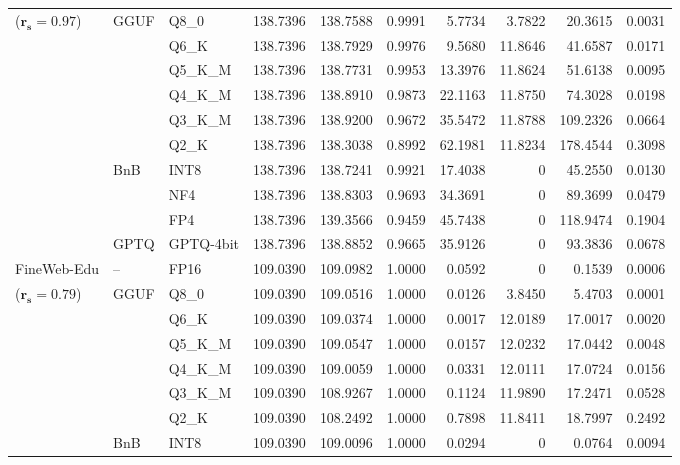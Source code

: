 \begin{table}[t]
{\begin{tabular}{ll l rrrrrrr}
{\small ($\mathbf{r_s{=}0.97}$)} & GGUF & Q8\_0 & 138.7396 & 138.7588 & 0.9991 & 5.7734 & 3.7822 & 20.3615 & 0.0031 \\
 &  & Q6\_K & 138.7396 & 138.7929 & 0.9976 & 9.5680 & 11.8646 & 41.6587 & 0.0171 \\
 &  & Q5\_K\_M & 138.7396 & 138.7731 & 0.9953 & 13.3976 & 11.8624 & 51.6138 & 0.0095 \\
 &  & Q4\_K\_M & 138.7396 & 138.8910 & 0.9873 & 22.1163 & 11.8750 & 74.3028 & 0.0198 \\
 &  & Q3\_K\_M & 138.7396 & 138.9200 & 0.9672 & 35.5472 & 11.8788 & 109.2326 & 0.0664 \\
 &  & Q2\_K & 138.7396 & 138.3038 & \cellcolor{red!18} 0.8992 & \cellcolor{red!18} 62.1981 & 11.8234 & \cellcolor{red!18} 178.4544 & \cellcolor{red!18} 0.3098 \\
 & BnB & INT8 & 138.7396 & 138.7241 & 0.9921 & 17.4038 & \cellcolor{cyan!12} $0$ & 45.2550 & 0.0130 \\
 &  & NF4 & 138.7396 & 138.8303 & 0.9693 & 34.3691 & \cellcolor{cyan!12} $0$ & 89.3699 & 0.0479 \\
 &  & FP4 & 138.7396 & 139.3566 & \cellcolor{red!18} 0.9459 & \cellcolor{red!18} 45.7438 & \cellcolor{cyan!12} $0$ & \cellcolor{red!18} 118.9474 & \cellcolor{red!18} 0.1904 \\
 & GPTQ & GPTQ-4bit & 138.7396 & 138.8852 & 0.9665 & 35.9126 & \cellcolor{cyan!12} $0$ & 93.3836 & 0.0678 \\
\midrule
FineWeb-Edu & -- & FP16 & 109.0390 & 109.0982 & 1.0000 & 0.0592 & \cellcolor{cyan!12} $0$ & 0.1539 & 0.0006 \\
{\small ($\mathbf{r_s{=}0.79}$)} & GGUF & Q8\_0 & 109.0390 & 109.0516 & 1.0000 & 0.0126 & 3.8450 & 5.4703 & 0.0001 \\
 &  & Q6\_K & 109.0390 & 109.0374 & 1.0000 & 0.0017 & 12.0189 & 17.0017 & 0.0020 \\
 &  & Q5\_K\_M & 109.0390 & 109.0547 & 1.0000 & 0.0157 & 12.0232 & 17.0442 & 0.0048 \\
 &  & Q4\_K\_M & 109.0390 & 109.0059 & 1.0000 & 0.0331 & 12.0111 & 17.0724 & 0.0156 \\
 &  & Q3\_K\_M & 109.0390 & 108.9267 & 1.0000 & 0.1124 & 11.9890 & 17.2471 & 0.0528 \\
 &  & Q2\_K & 109.0390 & 108.2492 & 1.0000 & 0.7898 & 11.8411 & 18.7997 & 0.2492 \\
 & BnB & INT8 & 109.0390 & 109.0096 & 1.0000 & 0.0294 & \cellcolor{cyan!12} $0$ & 0.0764 & 0.0094 \\

\end{tabular}}
\end{table}
